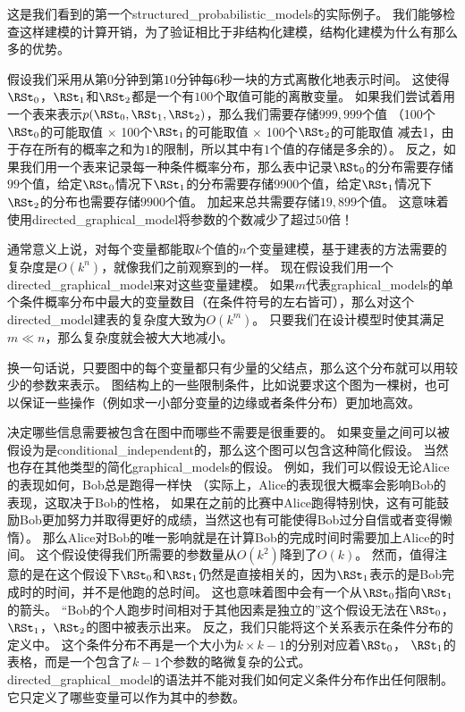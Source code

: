 这是我们看到的第一个\gls{structured_probabilistic_models}的实际例子。
我们能够检查这样建模的计算开销，为了验证相比于非结构化建模，结构化建模为什么有那么多的优势。


假设我们采用从第$0$分钟到第$10$分钟每$6$秒一块的方式离散化地表示时间。
这使得$\RSt_0$，$\RSt_1$和$\RSt_2$都是一个有$100$个取值可能的离散变量。
如果我们尝试着用一个表来表示$p(\RSt_0, \RSt_1, \RSt_2)$，那么我们需要存储$999,999$个值
（100个$\RSt_0$的可能取值 $\times$ 100个$\RSt_1$的可能取值 $\times$ 100个$\RSt_2$的可能取值 减去1，由于存在所有的概率之和为$1$的限制，所以其中有$1$个值的存储是多余的）。
反之，如果我们用一个表来记录每一种条件概率分布，那么表中记录$\RSt_0$的分布需要存储$99$个值，给定$\RSt_0$情况下$\RSt_1$的分布需要存储9900个值，给定$\RSt_1$情况下$\RSt_2$的分布也需要存储$9900$个值。
加起来总共需要存储$19, 899$个值。
这意味着使用\gls{directed_graphical_model}将参数的个数减少了超过$50$倍！


通常意义上说，对每个变量都能取$k$个值的$n$个变量建模，基于建表的方法需要的复杂度是$O(k^n)$，就像我们之前观察到的一样。
现在假设我们用一个\gls{directed_graphical_model}来对这些变量建模。
如果$m$代表\gls{graphical_models}的单个条件概率分布中最大的变量数目（在条件符号的左右皆可），那么对这个\gls{directed_model}建表的复杂度大致为$O(k^m)$。
只要我们在设计模型时使其满足$m\ll n$，那么复杂度就会被大大地减小。


换一句话说，只要图中的每个变量都只有少量的父结点，那么这个分布就可以用较少的参数来表示。
图结构上的一些限制条件，比如说要求这个图为一棵树，也可以保证一些操作（例如求一小部分变量的边缘或者条件分布）更加地高效。



决定哪些信息需要被包含在图中而哪些不需要是很重要的。
如果变量之间可以被假设为是\gls{conditional_independent}的，那么这个图可以包含这种简化假设。
当然也存在其他类型的简化\gls{graphical_models}的假设。
例如，我们可以假设无论Alice的表现如何，Bob总是跑得一样快
（实际上，Alice的表现很大概率会影响Bob的表现，这取决于Bob的性格，
如果在之前的比赛中Alice跑得特别快，这有可能鼓励Bob更加努力并取得更好的成绩，当然这也有可能使得Bob过分自信或者变得懒惰）。
那么Alice对Bob的唯一影响就是在计算Bob的完成时间时需要加上Alice的时间。
这个假设使得我们所需要的参数量从$O(k^2)$降到了$O(k)$。
然而，值得注意的是在这个假设下$\RSt_0$和$\RSt_1$仍然是直接相关的，因为$\RSt_1$表示的是Bob完成时的时间，并不是他跑的总时间。
这也意味着图中会有一个从$\RSt_0$指向$\RSt_1$的箭头。
``Bob的个人跑步时间相对于其他因素是独立的''这个假设无法在$\RSt_0$，$\RSt_1$，$\RSt_2$的图中被表示出来。
反之，我们只能将这个关系表示在条件分布的定义中。
这个条件分布不再是一个大小为$k\times k-1$的分别对应着$\RSt_0$，  $\RSt_1$的表格，而是一个包含了$k-1$个参数的略微复杂的公式。
\gls{directed_graphical_model}的语法并不能对我们如何定义条件分布作出任何限制。
它只定义了哪些变量可以作为其中的参数。



